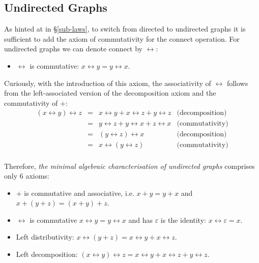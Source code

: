 \subsection{Undirected Graphs}\label{sub-undirected}

As hinted at in \S\ref{sub-laws}, to switch from directed to undirected graphs it
is sufficient to add the axiom of commutativity for the connect operation. For
undirected graphs we can denote connect by $\leftrightarrow$:

\begin{itemize}
    \item $\leftrightarrow$ is commutative: $x \leftrightarrow y = y \leftrightarrow x$.
\end{itemize}

Curiously, with the introduction of this axiom, the associativity of $\leftrightarrow$
follows from the left-associated version of the decomposition axiom and the
commutativity of $+$:
\[
\begin{array}{rcll}
(x \leftrightarrow y) \leftrightarrow z & = & x \leftrightarrow y + x \leftrightarrow z + y \leftrightarrow z & \text{(decomposition)}\\
 & = & y \leftrightarrow z + y \leftrightarrow x + z \leftrightarrow x & \text{(commutativity)}\\
 & = &  (y \leftrightarrow z) \leftrightarrow x & \text{(decomposition)}\\
 & = &   x \leftrightarrow (y \leftrightarrow z) & \text{(commutativity)}\\
\end{array}
\]

Therefore, \emph{the minimal algebraic characterisation of undirected graphs}
comprises only 6 axioms:

\begin{itemize}
    \item $+$ is commutative and associative, i.e. $x + y = y + x$ and
    $x + (y + z) = (x + y) + z$.
    \item $\leftrightarrow$ is commutative $x \leftrightarrow y = y \leftrightarrow x$ and
    has $\varepsilon$ is the identity: $x \leftrightarrow \varepsilon = x$.
    \item Left distributivity:
    $x \leftrightarrow (y + z) = x \leftrightarrow y + x \leftrightarrow z$.
    \item Left decomposition: $(x \leftrightarrow y) \leftrightarrow z =
    x \leftrightarrow y + x \leftrightarrow z + y \leftrightarrow z$.
\end{itemize}

